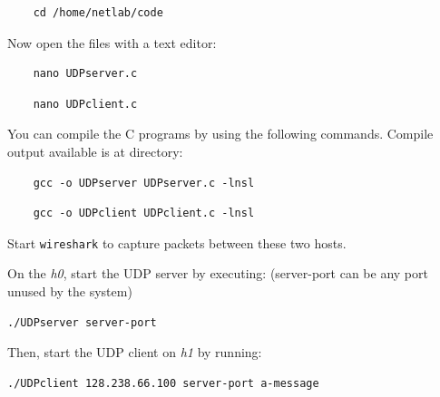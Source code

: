 \documentclass{UTNetLab}
\begin{document}
    \begin{lstlisting}
    cd /home/netlab/code
    \end{lstlisting}
    
    Now open the files with a text editor:
    
    \begin{lstlisting}
    nano UDPserver.c
    \end{lstlisting}
    
    \begin{lstlisting}
    nano UDPclient.c
    \end{lstlisting}
    
    You can compile the C programs by using the following commands. Compile output available is at  directory:

	\begin{lstlisting}
	gcc -o UDPserver UDPserver.c -lnsl
	\end{lstlisting}
	
	\begin{lstlisting}
	gcc -o UDPclient UDPclient.c -lnsl
	\end{lstlisting}
	
    Start \lstinline{wireshark} to capture packets between these two hosts.
    
    On the \textit{h0}, start the UDP server by executing: (server-port can be any port unused by the system)
    
   	\begin{lstlisting}[emph={server-port}]
   	./UDPserver server-port
   	\end{lstlisting}
    
    Then, start the UDP client on \textit{h1} by running:
    
   	\begin{lstlisting}[emph={server-port, a-message}]
   	./UDPclient 128.238.66.100 server-port a-message
   	\end{lstlisting}
   
\end{document}

